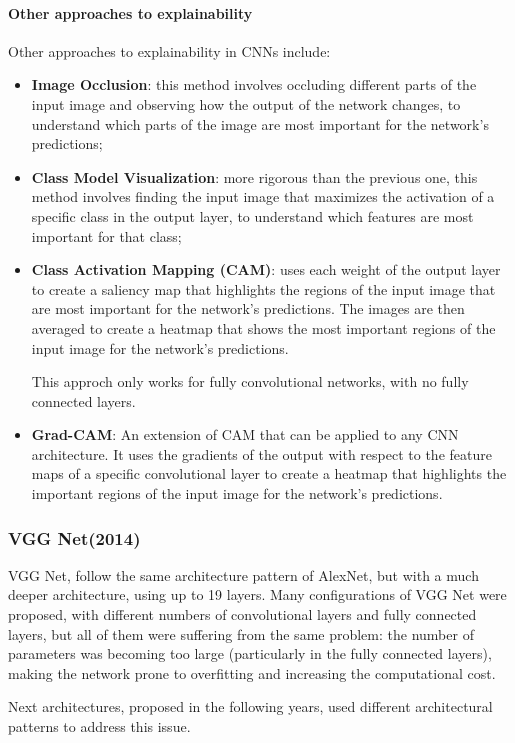 \paragraph{Other approaches to explainability}
Other approaches to explainability in CNNs include:
\begin{itemize}
    \item \textbf{Image Occlusion}: this method involves occluding different parts of the input image and observing how the output of the network changes, 
    to understand which parts of the image are most important for the network's predictions;
    \item \textbf{Class Model Visualization}: more rigorous than the previous one, this method involves finding the input image that maximizes the activation
    of a specific class in the output layer, to understand which features are most important for that class;
    \item \textbf{Class Activation Mapping (CAM)}: uses each weight of the output layer to create a saliency map that highlights the regions of the input image 
    that are most important for the network's predictions. The images are then averaged to create a heatmap that shows the most important regions of the input image for the network's predictions.
    
    This approch only works for fully convolutional networks, with no fully connected layers.
    \item \textbf{Grad-CAM}: An extension of CAM that can be applied to any CNN architecture. It uses the gradients of the output with respect to the feature maps of a specific convolutional 
    layer to create a heatmap that highlights the important regions of the input image for the network's predictions.
\end{itemize}

\subsubsection{VGG Net(2014)}
VGG Net, follow the same architecture pattern of AlexNet, but with a much deeper architecture, using up to 19 layers.
Many configurations of VGG Net were proposed, with different numbers of convolutional layers and fully connected layers, but all of them were suffering from the same problem: 
the number of parameters was becoming too large (particularly in the fully connected layers), making the network prone to overfitting and increasing the computational cost.

Next architectures, proposed in the following years, used different architectural patterns to address this issue.

